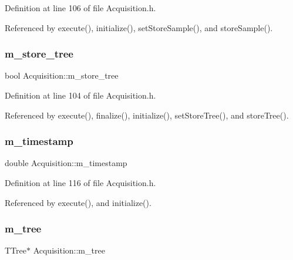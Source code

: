 Definition at line 106 of file Acquisition.\+h.



Referenced by execute(), initialize(), set\+Store\+Sample(), and store\+Sample().

\mbox{\label{classAcquisition_aca2143e9135e25554e58327475a767c5}} 
\subsubsection{\texorpdfstring{m\+\_\+store\+\_\+tree}{m\_store\_tree}}
{\footnotesize\ttfamily bool Acquisition\+::m\+\_\+store\+\_\+tree\hspace{0.3cm}{\ttfamily [private]}}



Definition at line 104 of file Acquisition.\+h.



Referenced by execute(), finalize(), initialize(), set\+Store\+Tree(), and store\+Tree().

\mbox{\label{classAcquisition_aa88cf8d27e075b5aaddb309dfb42cd04}} 
\subsubsection{\texorpdfstring{m\+\_\+timestamp}{m\_timestamp}}
{\footnotesize\ttfamily double Acquisition\+::m\+\_\+timestamp\hspace{0.3cm}{\ttfamily [private]}}



Definition at line 116 of file Acquisition.\+h.



Referenced by execute(), and initialize().

\mbox{\label{classAcquisition_a70f10db9c972f22a60bd2b82750168da}} 
\subsubsection{\texorpdfstring{m\+\_\+tree}{m\_tree}}
{\footnotesize\ttfamily T\+Tree$\ast$ Acquisition\+::m\+\_\+tree\hspace{0.3cm}{\ttfamily [private]}}




